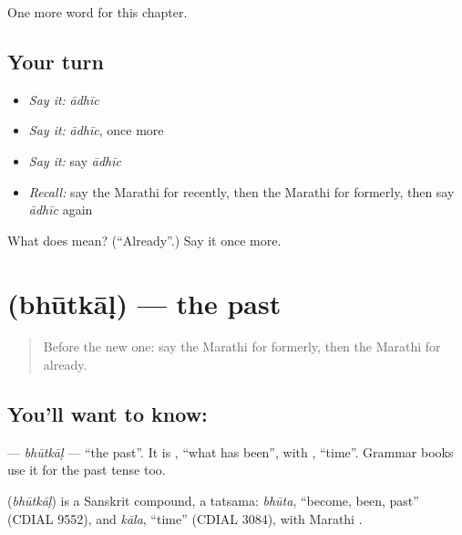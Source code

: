 \begin{grammarlens}[title={What you've built}]
One more word for this chapter.
\end{grammarlens}

\subsection*{Your turn}
\begin{itemize}
\raggedright
  \item \emph{Say it:} \emph{ādhīc}
  \item \emph{Say it:} \emph{ādhīc}, once more
  \item \emph{Say it:} say \emph{ādhīc}
  \item \emph{Recall:} say the Marathi for recently, then the Marathi for formerly, then say \emph{ādhīc} again
\end{itemize}

\begin{tcolorbox}[breakable,colback=teal!4,colframe=teal!35!black,title={Before you move on}]
What does  mean? (\textquotedblleft{}Already\textquotedblright{}.) Say it once more.
\end{tcolorbox}
\section[\texorpdfstring{\mr{भूतकाळ} (bhūtkāḷ)}{भूतकाळ (bhūtkāḷ)}]{ (bhūtkāḷ) — the past}

\label{lesson:MR-C159-bhutkal}



\begin{quote}
Before the new one: say the Marathi for formerly, then the Marathi for already.
\end{quote}

\subsection*{You'll want to know: }
\textbf{} — \emph{bhūtkāḷ} — \textquotedblleft{}the past\textquotedblright{}. It is \textbf{}, \textquotedblleft{}what has been\textquotedblright{}, with \textbf{}, \textquotedblleft{}time\textquotedblright{}. Grammar books use it for the past tense too.

\begin{cousinweb}
\textbf{} (\emph{bhūtkāḷ}) is a Sanskrit compound, a tatsama: \emph{bhūta}, \textquotedblleft{}become, been, past\textquotedblright{} (CDIAL 9552), and \emph{kāla}, \textquotedblleft{}time\textquotedblright{} (CDIAL 3084), with Marathi \textbf{}.
\end{cousinweb}

